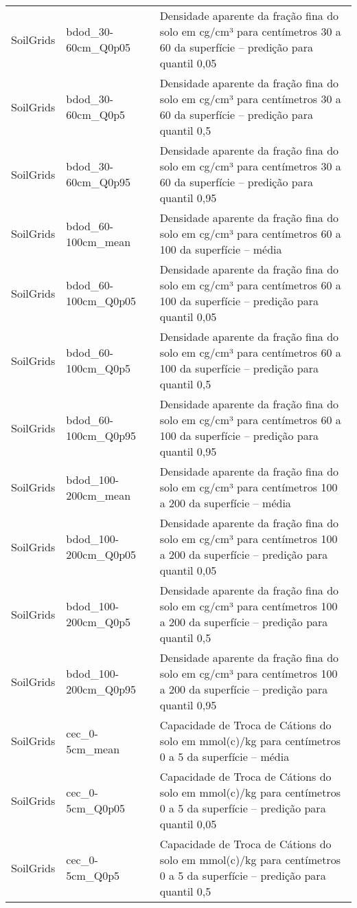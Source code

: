 \begin{longtable}{@{} p{4cm} p{4cm} p{8cm} @{}}
	SoilGrids &
	bdod\_30-60cm\_Q0p05 &
	Densidade aparente da fração fina do solo em cg/cm³ para centímetros 30 a 60 da superfície – predição para quantil 0,05 \\
	SoilGrids &
	bdod\_30-60cm\_Q0p5 &
	Densidade aparente da fração fina do solo em cg/cm³ para centímetros 30 a 60 da superfície – predição para quantil 0,5 \\
	SoilGrids &
	bdod\_30-60cm\_Q0p95 &
	Densidade aparente da fração fina do solo em cg/cm³ para centímetros 30 a 60 da superfície – predição para quantil 0,95 \\
	SoilGrids &
	bdod\_60-100cm\_mean &
	Densidade aparente da fração fina do solo em cg/cm³ para centímetros 60 a 100 da superfície – média \\
	SoilGrids &
	bdod\_60-100cm\_Q0p05 &
	Densidade aparente da fração fina do solo em cg/cm³ para centímetros 60 a 100 da superfície – predição para quantil 0,05 \\
	SoilGrids &
	bdod\_60-100cm\_Q0p5 &
	Densidade aparente da fração fina do solo em cg/cm³ para centímetros 60 a 100 da superfície – predição para quantil 0,5 \\
	SoilGrids &
	bdod\_60-100cm\_Q0p95 &
	Densidade aparente da fração fina do solo em cg/cm³ para centímetros 60 a 100 da superfície – predição para quantil 0,95 \\
	SoilGrids &
	bdod\_100-200cm\_mean &
	Densidade aparente da fração fina do solo em cg/cm³ para centímetros 100 a 200 da superfície – média \\
	SoilGrids &
	bdod\_100-200cm\_Q0p05 &
	Densidade aparente da fração fina do solo em cg/cm³ para centímetros 100 a 200 da superfície – predição para quantil 0,05 \\
	SoilGrids &
	bdod\_100-200cm\_Q0p5 &
	Densidade aparente da fração fina do solo em cg/cm³ para centímetros 100 a 200 da superfície – predição para quantil 0,5 \\
	SoilGrids &
	bdod\_100-200cm\_Q0p95 &
	Densidade aparente da fração fina do solo em cg/cm³ para centímetros 100 a 200 da superfície – predição para quantil 0,95 \\
	SoilGrids &
	cec\_0-5cm\_mean &
	Capacidade de Troca de Cátions do solo em mmol(c)/kg para centímetros 0 a 5 da superfície – média \\
	SoilGrids &
	cec\_0-5cm\_Q0p05 &
	Capacidade de Troca de Cátions do solo em mmol(c)/kg para centímetros 0 a 5 da superfície – predição para quantil 0,05 \\
	SoilGrids &
	cec\_0-5cm\_Q0p5 &
	Capacidade de Troca de Cátions do solo em mmol(c)/kg para centímetros 0 a 5 da superfície – predição para quantil 0,5 \\

\end{longtable}
